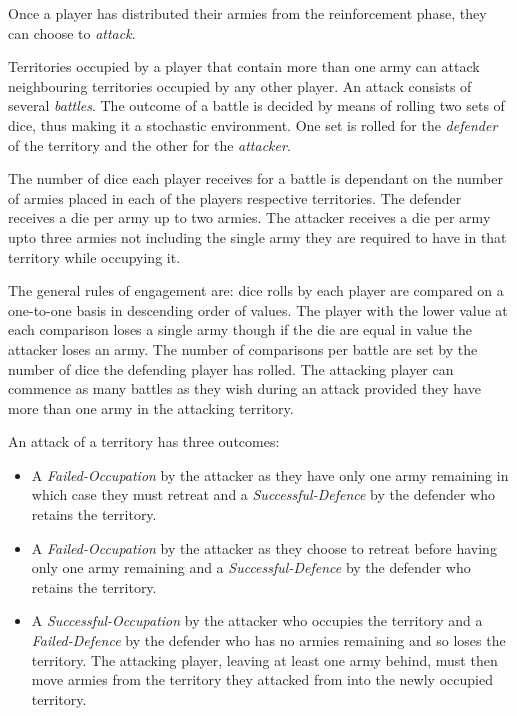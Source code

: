 \documentclass[parskip]{cs4rep}
\begin{document}
Once a player has distributed their armies from the reinforcement phase, they can choose to \textit{attack}. 

Territories occupied by a player that contain more than one army can attack neighbouring territories occupied by any other player. An attack consists of several \textit{battles}. The outcome of a battle is decided by means of rolling two sets of dice, thus making it a stochastic environment. One set is rolled for the \textit{defender} of the territory and the other for the \textit{attacker}. 

The number of dice each player receives for a battle is dependant on the number of armies placed in each of the players respective territories. The defender receives a die per army up to two armies. The attacker receives a die per army upto three armies not including the single army they are required to have in that territory while occupying it. 

The general rules of engagement are: dice rolls by each player are compared on a one-to-one basis in descending order of values. The player with the lower value at each comparison loses a single army though if the die are equal in value the attacker loses an army. The number of comparisons per battle are set by the number of dice the defending player has rolled. The attacking player can commence as many battles as they wish during an attack provided they have more than one army in the attacking territory.

An attack of a territory has three outcomes:

\begin{itemize}
\item
A \textit{Failed-Occupation} by the attacker as they have only one army remaining in which case they must retreat and a \textit{Successful-Defence} by the defender who retains the territory.
\item
A \textit{Failed-Occupation} by the attacker as they choose to retreat before having only one army remaining and a \textit{Successful-Defence} by the defender who retains the territory.
\item
A \textit{Successful-Occupation} by the attacker who occupies the territory and a \textit{Failed-Defence} by the defender who has no armies remaining and so loses the territory. The attacking player, leaving at least one army behind, must then move armies from the territory they attacked from into the newly occupied territory.
\end{itemize}
\end{document}
